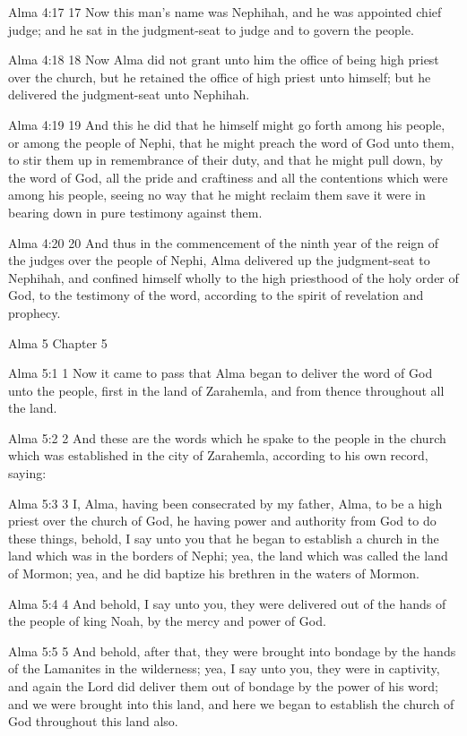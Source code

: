 Alma 4:17
 17 Now this man's name was Nephihah, and he was appointed chief
judge; and he sat in the judgment-seat to judge and to govern the
people.

Alma 4:18
 18 Now Alma did not grant unto him the office of being high
priest over the church, but he retained the office of high priest
unto himself; but he delivered the judgment-seat unto Nephihah.

Alma 4:19
 19 And this he did that he himself might go forth among his
people, or among the people of Nephi, that he might preach the
word of God unto them, to stir them up in remembrance of their
duty, and that he might pull down, by the word of God, all the
pride and craftiness and all the contentions which were among his
people, seeing no way that he might reclaim them save it were in
bearing down in pure testimony against them.

Alma 4:20
 20 And thus in the commencement of the ninth year of the reign
of the judges over the people of Nephi, Alma delivered up the
judgment-seat to Nephihah, and confined himself wholly to the
high priesthood of the holy order of God, to the testimony of the
word, according to the spirit of revelation and prophecy.

Alma 5
Chapter 5

Alma 5:1
 1 Now it came to pass that Alma began to deliver the word of God
unto the people, first in the land of Zarahemla, and from thence
throughout all the land.

Alma 5:2
 2 And these are the words which he spake to the people in the
church which was established in the city of Zarahemla, according
to his own record, saying:

Alma 5:3
 3 I, Alma, having been consecrated by my father, Alma, to be a
high priest over the church of God, he having power and authority
from God to do these things, behold, I say unto you that he began
to establish a church in the land which was in the borders of
Nephi; yea, the land which was called the land of Mormon; yea,
and he did baptize his brethren in the waters of Mormon.

Alma 5:4
 4 And behold, I say unto you, they were delivered out of the
hands of the people of king Noah, by the mercy and power of God.

Alma 5:5
 5 And behold, after that, they were brought into bondage by the
hands of the Lamanites in the wilderness; yea, I say unto you,
they were in captivity, and again the Lord did deliver them out
of bondage by the power of his word; and we were brought into
this land, and here we began to establish the church of God
throughout this land also.

